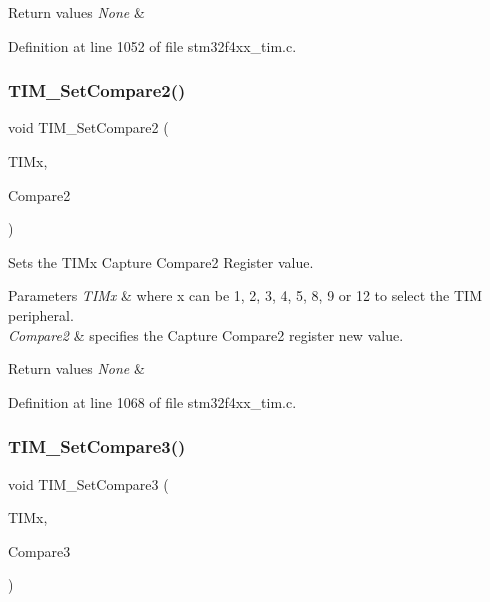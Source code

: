 \begin{DoxyRetVals}{Return values}
{\em None} & \\
\hline
\end{DoxyRetVals}


Definition at line 1052 of file stm32f4xx\+\_\+tim.\+c.

\mbox{\label{group___t_i_m_ga3de36754f3ba5d46b9ef2bf8e77575c7}} 
\subsubsection{\texorpdfstring{T\+I\+M\+\_\+\+Set\+Compare2()}{TIM\_SetCompare2()}}
{\footnotesize\ttfamily void T\+I\+M\+\_\+\+Set\+Compare2 (\begin{DoxyParamCaption}\item[{\hyperlink{struct_t_i_m___type_def}{T\+I\+M\+\_\+\+Type\+Def} $\ast$}]{T\+I\+Mx,  }\item[{uint32\+\_\+t}]{Compare2 }\end{DoxyParamCaption})}



Sets the T\+I\+Mx Capture Compare2 Register value. 


\begin{DoxyParams}{Parameters}
{\em T\+I\+Mx} & where x can be 1, 2, 3, 4, 5, 8, 9 or 12 to select the T\+IM peripheral. \\
\hline
{\em Compare2} & specifies the Capture Compare2 register new value. \\
\hline
\end{DoxyParams}

\begin{DoxyRetVals}{Return values}
{\em None} & \\
\hline
\end{DoxyRetVals}


Definition at line 1068 of file stm32f4xx\+\_\+tim.\+c.

\mbox{\label{group___t_i_m_gac372fbbbbc20329802659dd6c6b4e051}} 
\subsubsection{\texorpdfstring{T\+I\+M\+\_\+\+Set\+Compare3()}{TIM\_SetCompare3()}}
{\footnotesize\ttfamily void T\+I\+M\+\_\+\+Set\+Compare3 (\begin{DoxyParamCaption}\item[{\hyperlink{struct_t_i_m___type_def}{T\+I\+M\+\_\+\+Type\+Def} $\ast$}]{T\+I\+Mx,  }\item[{uint32\+\_\+t}]{Compare3 }\end{DoxyParamCaption})}



